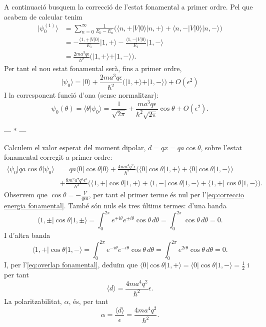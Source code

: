 \documentclass[12pt]{article}
\numberwithin{table}{section}
\numberwithin{figure}{section}
\newcommand{\ket}[1]{\vert {#1} \rangle}
\newcommand{\bra}[1]{\langle #1 \vert}
\newcommand{\braket}[2]{\langle {#1} \vert {#2} \rangle}
\newcommand{\parbreak}{
	\begin{center}
		--- $\ast$ ---
	\end{center} 
}
\begin{document}
A continuació busquem la correcció de l'estat fonamental a primer ordre. Pel que acabem de calcular tenim
\begin{align*}
	\ket{\psi_0^{(1)}} &= \sum_{n = 0}^{\infty} \frac{1}{E_0 - E_n} \big( \bra{n, +}V\ket{0} \ket{n,+} + \bra{n,-}V\ket{0}\ket{n,-} \big) \\
										 &= -\frac{\bra{1,+}V\ket{0}}{E_1} \ket{1,+} -\frac{\bra{1,-}V\ket{0}}{E_1} \ket{1,-} \\
										 &= \frac{2ma^3q\epsilon}{\hbar^2}\big(\ket{1,+} + \ket{1,-}\big).
\end{align*}
Per tant el nou estat fonamental serà, fins a primer ordre,
\begin{equation*}
	\ket{\psi_0} = \ket{0} +\frac{2ma^3q\epsilon}{\hbar^2}\big(\ket{1,+} + \ket{1,-}\big) + O(\epsilon^2)
\end{equation*}
I la corresponent funció d'ona (sense normalitzar):
\begin{equation*}
	\psi_0(\theta) = \braket{\theta}{\psi_0} = \frac{1}{\sqrt{2\pi}} + \frac{ma^3q\epsilon}{\hbar^2\sqrt{2\pi}} \cos{\theta} + O(\epsilon^2).
\end{equation*}

\parbreak

Calculem el valor esperat del moment dipolar, \( d = qx = qa\cos{\theta} \), sobre l'estat fonamental corregit a primer ordre:
\begin{align*}
	\bra{\psi_0}qa\cos{\theta}\ket{\psi_0} & = qa\bra{0}\cos{\theta}\ket{0} + \frac{4ma^4q^2\epsilon}{\hbar^2} \big( \bra{0}\cos{\theta}\ket{1,+} + \bra{0}\cos{\theta}\ket{1,-} \big) \\
																				 & + \frac{8m^2a^7q^3\epsilon^3}{\hbar^4} \big( \bra{1,+}\cos{\theta}\ket{1,+} + \bra{1,-}\cos{\theta}\ket{1,-} + \bra{1,+}\cos{\theta}\ket{1,-} \big).
\end{align*}
Observem que \( \cos{\theta} = -\frac{V}{q\epsilon a} \), per tant el primer terme és nul per l'\cref{eq:correccio energia fonamental}. També són nuls els tres últims termes: d'una banda
\begin{equation*}
	\bra{1,\pm}\cos{\theta}\ket{1,\pm} = \int_0^{2\pi} e^{\mp i\theta} e^{\pm i\theta} \cos{\theta} \,d\theta = \int_0^{2\pi} \cos{\theta} \, d\theta = 0.
\end{equation*}
I d'altra banda
\begin{equation*}
	\bra{1,+}\cos{\theta}\ket{1,-} = \int_0^{2\pi} e^{- i\theta} e^{- i\theta} \cos{\theta} \,d\theta = \int_0^{2\pi} e^{2i\theta}\cos{\theta} \, d\theta = 0.
\end{equation*}
I, per l'\cref{eq:overlap fonamental}, deduïm que \( \bra{0}\cos{\theta}\ket{1,+} = \bra{0}\cos{\theta}\ket{1,-} = \frac{1}{2} \) i per tant 
\begin{equation*}
	\langle d \rangle = \frac{4ma^4q^2}{\hbar^2}\epsilon.
\end{equation*}
La polaritzabilitat, \( \alpha \), és, per tant
\begin{equation*}
	\alpha = \frac{\langle d \rangle}{\epsilon} = \frac{4ma^4q^2}{\hbar^2}.
\end{equation*}
\end{document}
